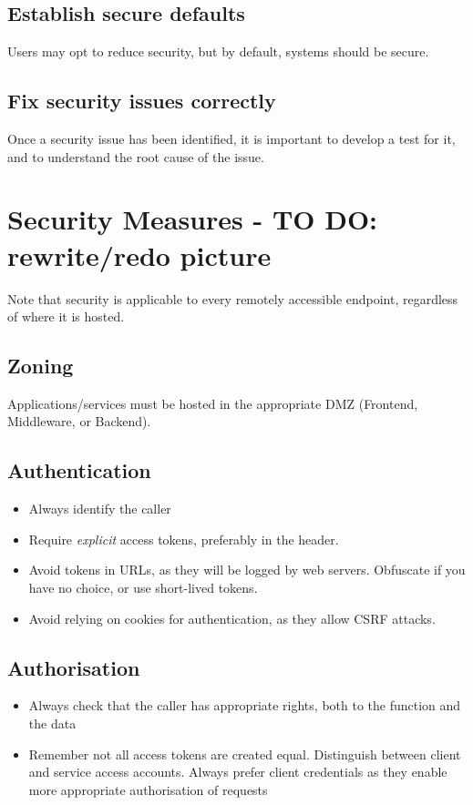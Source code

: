 \documentclass[a5paper,pagesize,10pt,bibtotoc,DIV=10,twoside]{scrbook}
\begin{document}
\subsection{Establish secure defaults}
Users may opt to reduce security, but by default, systems should be secure.

\subsection{Fix security issues correctly}
Once a security issue has been identified, it is important to develop a test for it, and to understand the root cause of the issue.



\section{Security Measures - \textbf{TO DO:} rewrite/redo picture}


Note that security is applicable to every remotely accessible endpoint, regardless of where it is hosted. \\

\subsection{Zoning}
Applications/services must be hosted in the appropriate DMZ (Frontend, Middleware, or Backend).

\subsection{Authentication}
\begin{itemize}
\item Always identify the caller
\item Require \textit{explicit} access tokens, preferably in the header.
\item Avoid tokens in URLs, as they will be logged by web servers. Obfuscate if you have no choice, or use short-lived tokens.
\item Avoid relying on cookies for authentication, as they allow CSRF attacks.
\end{itemize}

\subsection{Authorisation}
\begin{itemize}
\item Always check that the caller has appropriate rights, both to the function and the data
\item Remember not all access tokens are created equal. Distinguish between client and service access accounts. Always prefer client credentials as they enable more appropriate authorisation of requests
\end{itemize}
\end{document}
